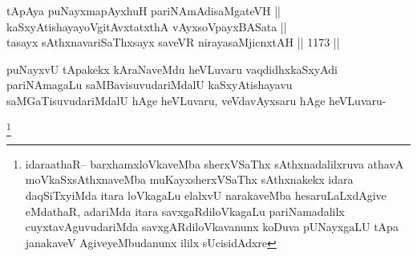 \begin{shl}
tApAya puNayxmapAyxhuH pariNAmAdisaMgateVH || \\
kaSxyAtishayayoVgitAvxtatxthA vAyxsoV\s payxBASata || \\
tasayx sAthxnavariSaThxsayx saveVR nirayasaMjicnxtAH ||  1173 ||  
\end{shl}	

\begin{artha}
puNayxvU tApakekx kAraNaveMdu heVLuvaru vaqdidhxkaSxyAdi pariNAmagaLu saMBavisuvudariMdalU kaSxyAtishayavu saMGaTisuvudariMdalU hAge heVLuvaru, veVdavAyxsaru hAge heVLuvaru-
\end{artha}

\begin{artha}
\footnote{idaraathaR-- barxhamxloVkaveMba sherxVSaThx sAthxnadalilxruva athavA moVkaSxsAthxnaveMba muKayxsherxVSaThx sAthxnakekx idara daqSiTxyiMda itara loVkagaLu elalxvU narakaveMba hesaruLaLxdAgive eMdathaR, adariMda itara savxgaRdiloVkagaLu pariNamadalilx cuyxtavAguvudariMda savxgARdiloVkavanunx koDuva pUNayxgaLU tApa janakaveV AgiveyeMbudanunx ililx sUcisidAdxre}
\end{artha}
